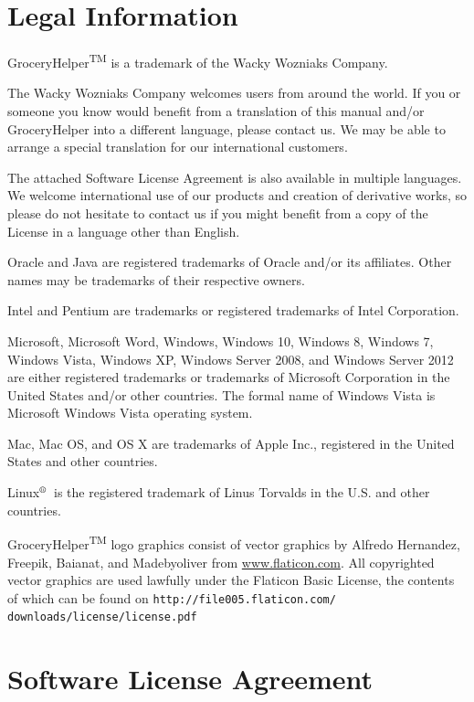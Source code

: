 \documentclass[letterpaper,12pt]{article}
\begin{document}
\pagebreak

\section{Legal Information}

GroceryHelper{\footnotesize \textsuperscript{TM}} is a trademark of the Wacky Wozniaks Company.

The Wacky Wozniaks Company welcomes users from around the world. If you or someone you know would benefit from a translation of this manual and/or GroceryHelper into a different language, please contact us. We may be able to arrange a special translation for our international customers. 

The attached Software License Agreement is also available in multiple languages. We welcome international use of our products and creation of derivative works, so please do not hesitate to contact us if you might benefit from a copy of the License in a language other than English. 


Oracle and Java are registered trademarks of Oracle and/or its affiliates. Other names may be trademarks of their respective owners.

Intel and Pentium are trademarks or registered trademarks of Intel Corporation.

Microsoft, Microsoft Word, Windows, Windows 10, Windows 8, Windows 7, Windows Vista, Windows XP, Windows Server 2008, and Windows Server 2012 are either registered trademarks or trademarks of Microsoft Corporation in the United States and/or other countries. The formal name of Windows Vista is Microsoft Windows Vista operating system.

Mac, Mac OS, and OS X are trademarks of Apple Inc., registered in the United States and other countries. 

Linux$^\text{\textregistered}$~is the registered trademark of Linus Torvalds in the U.S. and other countries.

GroceryHelper{\footnotesize\textsuperscript{TM}} logo graphics consist of vector graphics by Alfredo Hernandez, Freepik, Baianat, and Madebyoliver from \url{www.flaticon.com}. All copyrighted vector graphics are used lawfully under the Flaticon Basic License, the contents of which can be found on \verb|http://file005.flaticon.com/| \verb|downloads/license/license.pdf|




\pagebreak

\section{Software License Agreement}
\end{document}
